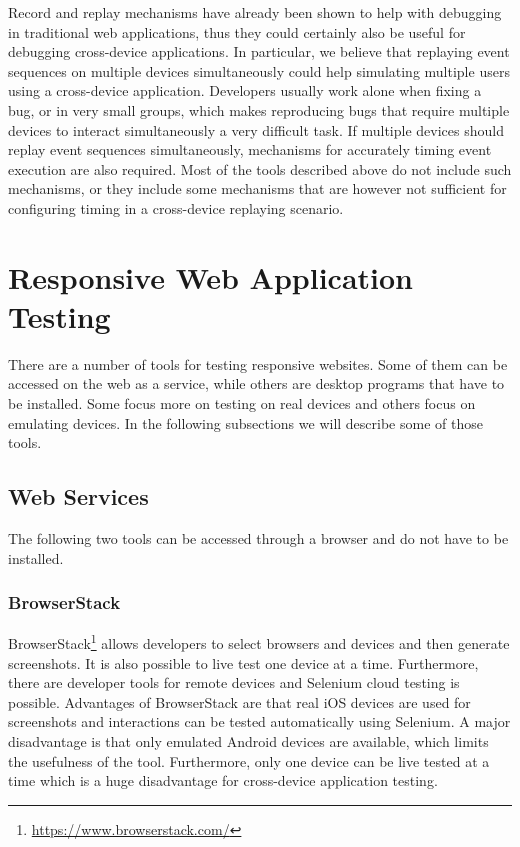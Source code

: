 Record and replay mechanisms have already been shown to help with debugging in traditional web applications, thus they could certainly also be useful for debugging cross-device applications. In particular, we believe that replaying event sequences on multiple devices simultaneously could help simulating multiple users using a cross-device application. Developers usually work alone when fixing a bug, or in very small groups, which makes reproducing bugs that require multiple devices to interact simultaneously a very difficult task. If multiple devices should replay event sequences simultaneously, mechanisms for accurately timing event execution are also required. Most of the tools described above do not include such mechanisms, or they include some mechanisms that are however not sufficient for configuring timing in a cross-device replaying scenario.

\section{Responsive Web Application Testing}

There are a number of tools for testing responsive websites. Some of them can be accessed on the web as a service, while others are desktop programs that have to be installed. Some focus more on testing on real devices and others focus on emulating devices. In the following subsections we will describe some of those tools.

\subsection{Web Services}

The following two tools can be accessed through a browser and do not have to be installed.

\subsubsection{BrowserStack}

BrowserStack\footnote{\url{https://www.browserstack.com/}} allows developers to select browsers and devices and then generate screenshots. It is also possible to live test one device at a time. Furthermore, there are developer tools for remote devices and Selenium cloud testing is possible. Advantages of BrowserStack are that real iOS devices are used for screenshots and interactions can be tested automatically using Selenium. A major disadvantage is that only emulated Android devices are available, which limits the usefulness of the tool. Furthermore, only one device can be live tested at a time which is a huge disadvantage for cross-device application testing. 

